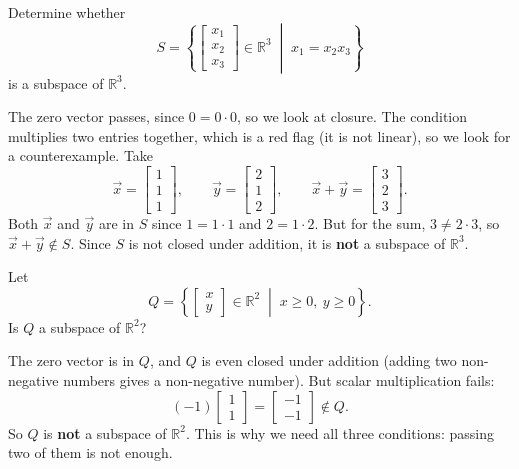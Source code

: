 \begin{example}
Determine whether
\[S = \left\{ \begin{bmatrix} x_1 \\ x_2 \\ x_3 \end{bmatrix} \in \mathbb{R}^3 \;\middle\vert{}\; x_1 = x_2 x_3 \right\}\]
is a subspace of $\mathbb{R}^3$.

\begin{solution}
The zero vector passes, since $0 = 0 \cdot 0$, so we look at closure. The condition multiplies two entries together, which is a red flag (it is not linear), so we look for a counterexample. Take
\[\vec{x} = \begin{bmatrix} 1 \\ 1 \\ 1 \end{bmatrix}, \qquad \vec{y} = \begin{bmatrix} 2 \\ 1 \\ 2 \end{bmatrix}, \qquad \vec{x} + \vec{y} = \begin{bmatrix} 3 \\ 2 \\ 3 \end{bmatrix}.\]
Both $\vec{x}$ and $\vec{y}$ are in $S$ since $1 = 1 \cdot 1$ and $2 = 1 \cdot 2$. But for the sum, $3 \neq 2 \cdot 3$, so $\vec{x} + \vec{y} \notin S$. Since $S$ is not closed under addition, it is \textbf{not} a subspace of $\mathbb{R}^3$.
\end{solution}
\end{example}

\begin{example}
Let
\[Q = \left\{ \begin{bmatrix} x \\ y \end{bmatrix} \in \mathbb{R}^2 \;\middle\vert{}\; x \ge 0, \ y \ge 0 \right\}.\]
Is $Q$ a subspace of $\mathbb{R}^2$?

\begin{solution}
The zero vector is in $Q$, and $Q$ is even closed under addition (adding two non-negative numbers gives a non-negative number). But scalar multiplication fails:
\[(-1)\begin{bmatrix} 1 \\ 1 \end{bmatrix} = \begin{bmatrix} -1 \\ -1 \end{bmatrix} \notin Q.\]
So $Q$ is \textbf{not} a subspace of $\mathbb{R}^2$. This is why we need all three conditions: passing two of them is not enough.
\end{solution}
\end{example}